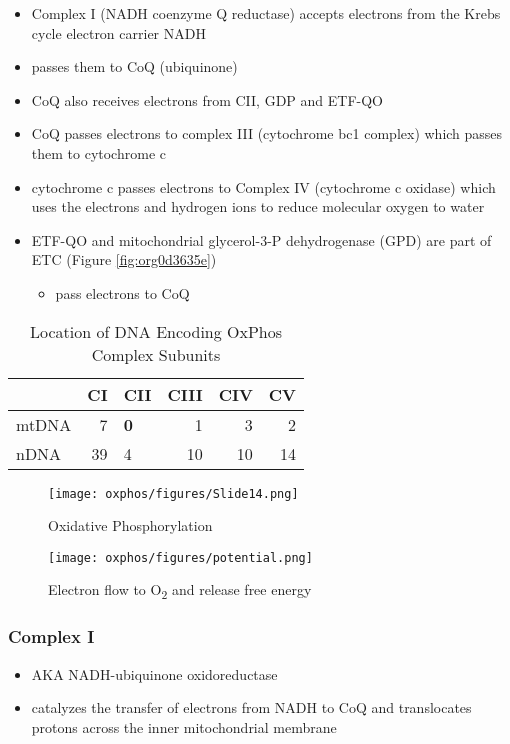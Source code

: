 \documentclass[12pt]{scrartcl}
\begin{document}
\begin{itemize}
\item Complex I (NADH coenzyme Q reductase) accepts electrons from the
Krebs cycle electron carrier NADH
\item passes them to CoQ (ubiquinone)
\item CoQ also receives electrons from CII, GDP and ETF-QO

\item CoQ passes electrons to complex III (cytochrome bc1 complex) which
passes them to cytochrome c
\item cytochrome c passes electrons to Complex IV (cytochrome c oxidase)
which uses the electrons and hydrogen ions to reduce molecular
oxygen to water

\item ETF-QO and mitochondrial glycerol-3-P dehydrogenase (GPD) are part of ETC (Figure \ref{fig:org0d3635e})
\begin{itemize}
\item pass electrons to CoQ
\end{itemize}
\end{itemize}

\begin{table}[htbp]
\caption{\label{tab:orgcfad8f4}Location of DNA Encoding OxPhos Complex Subunits}
\centering
\begin{tabular}{lrlrrr}
 & CI & CII & CIII & CIV & CV\\
\hline
mtDNA & 7 & \textbf{0} & 1 & 3 & 2\\
nDNA & 39 & 4 & 10 & 10 & 14\\
\end{tabular}
\end{table}

\begin{figure}[htbp]
\centering
\texttt{[image: oxphos/figures/Slide14.png]}
\caption[ETC]{\label{fig:orge8ed47a}Oxidative Phosphorylation}
\end{figure}

\begin{figure}[htbp]
\centering
\texttt{[image: oxphos/figures/potential.png]}
\caption[redox]{\label{fig:org440f9ec}Electron flow to O\textsubscript{2} and release free energy}
\end{figure}

\subsubsection{Complex I}
\label{sec:org41e92b4}
\begin{itemize}
\item AKA NADH-ubiquinone oxidoreductase
\item catalyzes the transfer of electrons from NADH to CoQ and
translocates protons across the inner mitochondrial membrane
\end{itemize}
\end{document}
